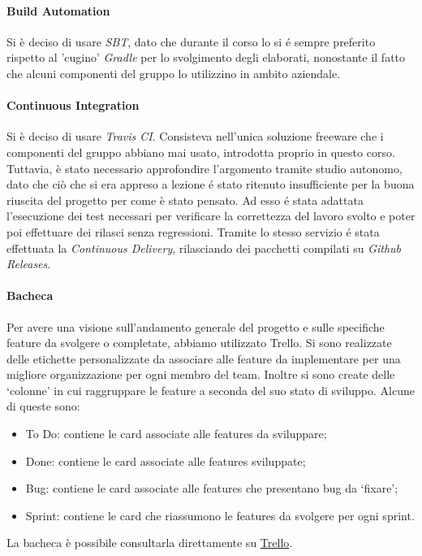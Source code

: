 \paragraph{Build Automation}
Si è deciso di usare \textit{SBT}, dato che durante il corso lo si é sempre preferito rispetto al 'cugino' \textit{Gradle} per lo svolgimento degli elaborati, nonostante il fatto che alcuni componenti del gruppo lo utilizzino in ambito aziendale.

\paragraph{Continuous Integration}
Si è deciso di usare \textit{Travis CI}.
Consisteva nell'unica soluzione freeware che i componenti del gruppo abbiano mai usato, introdotta proprio in questo corso.
Tuttavia, è stato necessario approfondire l'argomento tramite studio autonomo, dato che ciò che si era appreso a lezione é stato ritenuto insufficiente per la buona riuscita del progetto per come è stato pensato.
Ad esso é stata adattata l'esecuzione dei test necessari per verificare la correttezza del lavoro svolto e poter poi effettuare dei rilasci senza regressioni.
Tramite lo stesso servizio é stata effettuata la \textit{Continuous Delivery}, rilasciando dei pacchetti compilati su \textit{Github Releases}.

\newpage

\paragraph{Bacheca}
Per avere una visione sull’andamento generale del progetto e sulle specifiche feature da svolgere o completate, abbiamo utilizzato Trello.
Si sono realizzate delle etichette personalizzate da associare alle feature da implementare per una migliore organizzazione per ogni membro del team.
Inoltre si sono create delle ‘colonne’ in cui raggruppare le feature a seconda del suo stato di sviluppo.
Alcune di queste sono:
\begin{itemize}
    \item To Do: contiene le card associate alle features da sviluppare;
    \item Done: contiene le card associate alle features sviluppate;
    \item Bug: contiene le card associate alle features che presentano bug da ‘fixare’;
    \item Sprint: contiene le card che riassumono le features da svolgere per ogni sprint.
\end{itemize}
La bacheca è possibile consultarla direttamente su \href{https://trello.com/b/Nk4j3Kuf/pps}{Trello}.

